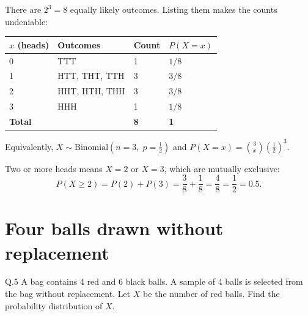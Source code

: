 \begin{solution}
There are $2^{3}=8$ equally likely outcomes. Listing them makes the counts
undeniable:

\begin{center}
\small\sffamily
\begin{tabular}{@{}C{2.0cm} L{5.6cm} C{2.0cm} C{2.0cm}@{}}
\toprule
$x$ (heads) & Outcomes & Count & $P(X=x)$ \\
 & TTT                & 1 & $1/8$ \\
1 & HTT, THT, TTH      & 3 & $3/8$ \\
2 & HHT, HTH, THH      & 3 & $3/8$ \\
3 & HHH                & 1 & $1/8$ \\
\midrule
\textbf{Total} & & \textbf{8} & \textbf{1} \\
\bottomrule
\end{tabular}
\end{center}

Equivalently, $X\sim\text{Binomial}(n=3,\;p=\tfrac12)$ and
$P(X=x)=\binom{3}{x}\left(\tfrac12\right)^{3}$.

\medskip
Two or more heads means $X=2$ or $X=3$, which are mutually exclusive:
\[
P(X\ge 2)=P(2)+P(3)=\frac{3}{8}+\frac{1}{8}=\frac{4}{8}=\frac{1}{2}=0.5 .
\]

\end{solution}

\section{Four balls drawn without replacement}

\begin{question}{Q.5}
A bag contains 4 red and 6 black balls. A sample of 4 balls is selected from the
bag without replacement. Let $X$ be the number of red balls. Find the
probability distribution of $X$.
\end{question}


